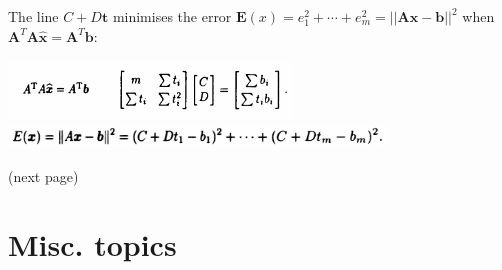 \documentclass{report}
\begin{document}
The line $C+D\bm{t}$ minimises the error $\bm E(x)=e_1^2+\cdots+e_m^2=||\bm{Ax}-\bm b||^2$ when $\bm A^T\bm A\hat{\bm x}=\bm A^T\bm b$:
\begin{center}
\includegraphics[width=7.5cm]{78}
\includegraphics[width=10cm]{79}
\end{center}
(next page)\newpage
\subsection{}





\newpage





\appendix
\chapter{Misc. topics}
\end{document}
